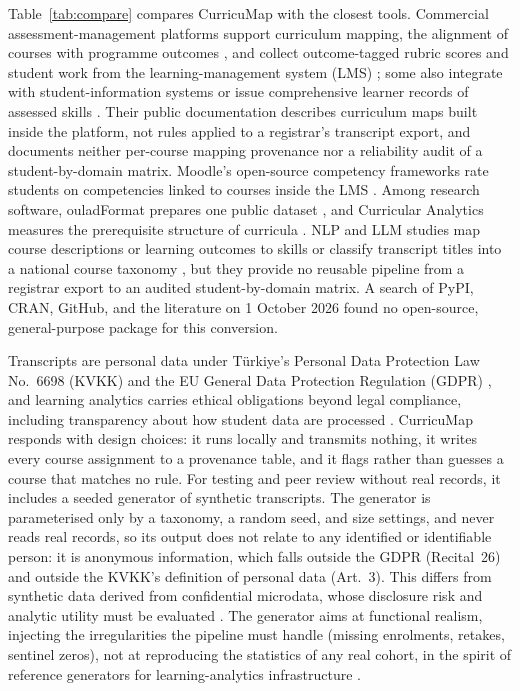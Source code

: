 \documentclass[preprint,12pt,a4paper]{elsarticle}
\begin{document}
Table~\ref{tab:compare} compares CurricuMap with the closest tools. Commercial assessment-management platforms support curriculum mapping, the alignment of courses with programme outcomes \cite{smith2024}, and collect outcome-tagged rubric scores and student work from the learning-management system (LMS) \cite{heliocampus,elumen,watermark}; some also integrate with student-information systems or issue comprehensive learner records of assessed skills \cite{heliocampus,elumen}. Their public documentation describes curriculum maps built inside the platform, not rules applied to a registrar's transcript export, and documents neither per-course mapping provenance nor a reliability audit of a student-by-domain matrix. Moodle's open-source competency frameworks rate students on competencies linked to courses inside the LMS \cite{moodlecompetencies}. Among research software, ouladFormat prepares one public dataset \cite{howard2025}, and Curricular Analytics measures the prerequisite structure of curricula \cite{heileman2018}. NLP and LLM studies map course descriptions or learning outcomes to skills \cite{zamecnik2024,xu2026} or classify transcript titles into a national course taxonomy \cite{paulson2024}, but they provide no reusable pipeline from a registrar export to an audited student-by-domain matrix. A search of PyPI, CRAN, GitHub, and the literature on 1 October 2026 found no open-source, general-purpose package for this conversion.

Transcripts are personal data under T\"urkiye's Personal Data Protection Law No.~6698 (KVKK) \cite{kvkk} and the EU General Data Protection Regulation (GDPR) \cite{gdpr}, and learning analytics carries ethical obligations beyond legal compliance, including transparency about how student data are processed \cite{slade2013}. CurricuMap responds with design choices: it runs locally and transmits nothing, it writes every course assignment to a provenance table, and it flags rather than guesses a course that matches no rule. For testing and peer review without real records, it includes a seeded generator of synthetic transcripts. The generator is parameterised only by a taxonomy, a random seed, and size settings, and never reads real records, so its output does not relate to any identified or identifiable person: it is anonymous information, which falls outside the GDPR (Recital~26) and outside the KVKK's definition of personal data (Art.~3). This differs from synthetic data derived from confidential microdata, whose disclosure risk and analytic utility must be evaluated \cite{drechsler2011,liu2024synthetic}. The generator aims at functional realism, injecting the irregularities the pipeline must handle (missing enrolments, retakes, sentinel zeros), not at reproducing the statistics of any real cohort, in the spirit of reference generators for learning-analytics infrastructure \cite{berg2016}.
\end{document}
